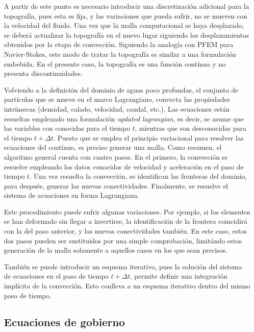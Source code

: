 A partir de este punto es necesario introducir una discretización adicional para la topografía, pues esta es fija, y las variaciones que pueda sufrir, no se mueven con la velocidad del fluido. Una vez que la malla computacional se haya desplazado, se deberá actualizar la topografía en el nuevo lugar siguiendo los desplazamientos obtenidos por la etapa de convección. Siguiendo la analogía con PFEM para Navier-Stokes, este modo de tratar la topografía es similar a una formulación embebida. En el presente caso, la topografía es una función contínua y no presenta discontinuidades.

Volviendo a la definición del dominio de aguas poco profundas, el conjunto de partículas que se mueve en el marco Lagrangiano, convecta las propiedades intrínsecas (densidad, calado, velocidad, caudal, etc.). Las ecuaciones están resueltas empleando una formulación \emph{updated lagrangian}, es decir, se asume que las variables con conocidas para el tiempo $t$, mientras que son desconocidas para el tiempo $t+\Delta t$. Puesto que se emplea el principio variacional para resolver las ecuaciones del contínuo, es preciso generar una malla. Como resumen, el algoritmo general cuenta con cuatro pasos. En el primero, la convección se resuelve empleando los datos conocidos de velocidad y aceleración en el paso de tiempo $t$. Una vez resuelta la convección, se identifican las fronteras del dominio, para después, generar las nuevas conectividades. Finalmente, se resuelve el sistema de acuaciones en forma Lagrangiana.

Este procedimiento puede sufrir algunas variaciones. Por ejemplo, si los elementos se han deformado sin llegar a invertirse, la identificación de la frontera coincidirá con la del paso anterior, y las nuevas conectividades también. En este caso, estos dos pasos pueden ser sustituidos por una simple comprobación, limitándo estos generación de la malla solamente a aquellos casos en los que sean precisos.

También se puede introducir un esquema iterativo, pues la solución del sistema de ecuaciones en el paso de tiempo $t+\Delta t$, permite definir una integración implícita de la convección. Esto conlleva a un esquema iterativo dentro del mismo paso de tiempo.

\subsection{Ecuaciones de gobierno}

